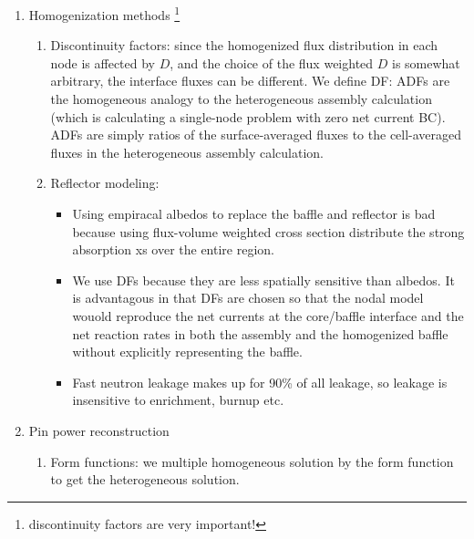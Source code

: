 \documentclass{school-22.211-notes}
\begin{document}
\begin{enumerate}
\clearpage
\item Homogenization methods \footnote{discontinuity factors are very important!}
  \begin{enumerate}
    \item Discontinuity factors: since the homogenized flux distribution in each node is affected by $D$, and the choice of the flux weighted $D$ is somewhat arbitrary, the interface fluxes can be different. We define DF: 
      ADFs are the homogeneous analogy to the heterogeneous assembly calculation (which is calculating a single-node problem with zero net current BC). ADFs are simply ratios of the surface-averaged fluxes to the cell-averaged fluxes in the heterogeneous assembly calculation.

    \item Reflector modeling: 
      \begin{itemize}
      \item Using empiracal albedos to replace the baffle and reflector is bad because using flux-volume weighted cross section distribute the strong absorption xs over the entire region. 
      \item We use DFs because they are less spatially sensitive than albedos. It is advantagous in that DFs are chosen so that the nodal model wouold reproduce the net currents at the core/baffle interface and the net reaction rates in both the assembly and the homogenized baffle without explicitly representing the baffle. 
      \item Fast neutron leakage makes up for 90\% of all leakage, so leakage is insensitive to enrichment, burnup etc. 
      \end{itemize}
  \end{enumerate}

\item Pin power reconstruction
  \begin{enumerate}
    \item Form functions: we multiple homogeneous solution by the form function to get the heterogeneous solution. 


\end{enumerate}
\end{enumerate}
\end{document}
